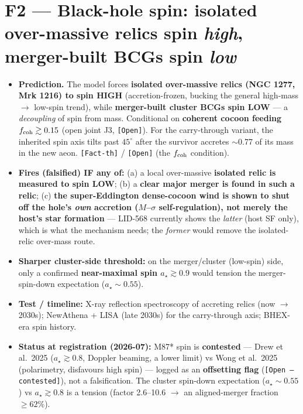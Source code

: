 \documentclass[11pt,a4paper]{article}
\newcommand{\st}[1]{\texttt{[#1]}}
\begin{document}
\section*{F2 --- Black-hole spin: isolated over-massive relics spin \emph{high}, merger-built BCGs spin \emph{low}}
\begin{itemize}
\item \textbf{Prediction.} The model forces \textbf{isolated over-massive relics (NGC 1277, Mrk 1216) to spin HIGH} (accretion-frozen, bucking the general high-mass $\to$ low-spin trend), while \textbf{merger-built cluster BCGs spin LOW} --- a \emph{decoupling} of spin from mass. Conditional on \textbf{coherent cocoon feeding $f_{\rm coh}\gtrsim0.15$} (open joint J3, \st{Open}). For the carry-through variant, the inherited spin axis tilts past $45^\circ$ after the survivor accretes $\sim$0.77 of its mass in the new aeon. \st{Fact-th} / \st{Open} (the $f_{\rm coh}$ condition).
\item \textbf{Fires (falsified) IF any of:} (a) a local over-massive \textbf{isolated relic is measured to spin LOW}; (b) a \textbf{clear major merger is found in such a relic}; (c) \textbf{the super-Eddington dense-cocoon wind is shown to shut off the hole's \emph{own} accretion ($M$--$\sigma$ self-regulation), not merely the host's star formation} --- LID-568 currently shows the \emph{latter} (host SF only), which is what the mechanism needs; the \emph{former} would remove the isolated-relic over-mass route.
\item \textbf{Sharper cluster-side threshold:} on the merger/cluster (low-spin) side, only a confirmed \textbf{near-maximal spin $a_\star\gtrsim0.9$} would tension the merger-spin-down expectation ($a_\star\sim0.55$).
\item \textbf{Test / timeline:} X-ray reflection spectroscopy of accreting relics (now $\to$ 2030s); NewAthena + LISA (late 2030s) for the carry-through axis; BHEX-era spin history.
\item \textbf{Status at registration (2026-07):} M87* spin is \textbf{contested} --- Drew et al.\ 2025 ($a_\star\gtrsim0.8$, Doppler beaming, a lower limit) vs Wong et al.\ 2025 (polarimetry, disfavours high spin) --- logged as an \textbf{offsetting flag} (\st{Open --- contested}), not a falsification. The cluster spin-down expectation ($a_\star\sim0.55$) vs $a_\star\gtrsim0.8$ is a tension (factor 2.6--10.6 $\to$ an aligned-merger fraction $\geq62\%$).
\end{itemize}
\end{document}
